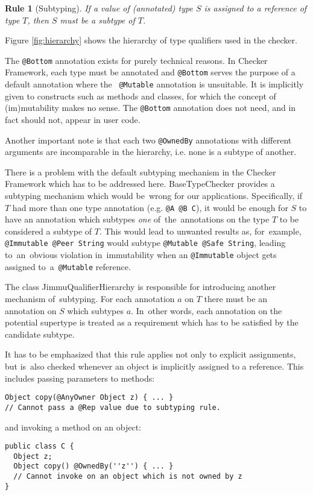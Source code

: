 \documentclass{pracamgr}
\theoremstyle{break}
\theoremstyle{break}
\theoremstyle{break}
\newtheorem{verrule}{Rule}
\begin{document}
\setcounter{verrule}{-1}
\begin{verrule}[Subtyping]
  If a value of (annotated) type $S$ is assigned to a reference of type $T$, 
  then $S$ must be a subtype of $T$.
\end{verrule}
Figure \ref{fig:hierarchy} shows the hierarchy of type qualifiers used
in the checker. 

The \texttt{@Bottom} annotation exists for purely technical
reasons. In Checker Framework, each type must be annotated and
\texttt{@Bottom} serves the purpose of a default annotation where the~
\texttt{@Mutable} annotation is unsuitable. It is implicitly given to
constructs such as methods and classes, for which the concept of
(im)mutability makes no sense. The \texttt{@Bottom} annotation does
not need, and in fact should not, appear in user code.

Another important note is that each two \texttt{@OwnedBy} annotations
with different arguments are incomparable in the hierarchy, i.e. none
is a subtype of another.

There is a problem with the default subtyping mechanism in the Checker
Framework which has to be addressed here. BaseTypeChecker provides a
subtyping mechanism which would be~wrong for our
applications. Specifically, if $T$ had more than one type annotation
(e.g. \texttt{@A~@B~C}), it would be enough for $S$ to have an
annotation which subtypes \emph{one} of~the~annotations on the type
$T$ to be considered a subtype of $T$. This would lead to unwanted
results as, for~example, \texttt{@Immutable @Peer String} would
subtype \texttt{@Mutable @Safe String}, leading to~an~obvious
violation in~immutability when an \texttt{@Immutable} object gets
assigned to~a~\texttt{@Mutable} reference.

The class JimmuQualifierHierarchy is responsible for introducing
another mechanism of~subtyping. For each annotation $a$ on $T$ there
must be an annotation on $S$ which subtypes $a$. In~other words, each
annotation on the potential supertype is treated as a requirement
which has to be satisfied by the candidate subtype. 

It has to be emphasized that this rule applies not only to explicit
assignments, but is~also checked whenever an object is implicitly
assigned to a reference. This includes passing parameters to methods:
\begin{lstlisting}
Object copy(@AnyOwner Object z) { ... } 
// Cannot pass a @Rep value due to subtyping rule.
\end{lstlisting}
and invoking a method on an object: 
\begin{lstlisting}
public class C {
  Object z;
  Object copy() @OwnedBy(''z'') { ... } 
  // Cannot invoke on an object which is not owned by z
}
\end{lstlisting}
\end{document}

